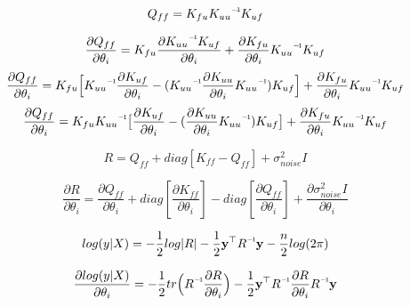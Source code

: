 \documentclass{article}
\newcommand\inv[1]{#1\raisebox{1.15ex}{$\scriptscriptstyle-\!1$}}
\begin{document}
  \begin{equation}
    Q_{ff} = K_{fu}  \inv{K_{uu}}  K_{uf}
  \end{equation}

  \begin{equation}
    \frac{\partial Q_{ff}}{\partial \theta_{i}} =
    K_{fu}  \frac{\partial {\inv{K_{uu}}  K_{uf}}}{\partial \theta_{i}} +
    {\frac{\partial K_{fu}}{\partial \theta_{i}}}  {\inv{K_{uu}}  K_{uf}}
  \end{equation}
  \begin{equation}
    \frac{\partial Q_{ff}}{\partial \theta_{i}} =
    K_{fu}  \Big[ \inv{K_{uu}}  \frac{\partial K_{uf}}{\partial \theta_{i}}  -
      (\inv{K_{uu}}  \frac{\partial K_{uu}}{\partial \theta_{i}}  \inv{K_{uu}})  K_{uf}
        \Big] +
        \frac{\partial K_{fu}}{\partial \theta_{i}}  \inv{K_{uu}}  K_{uf}
  \end{equation}
  \begin{equation}
    \frac{\partial Q_{ff}}{\partial \theta_{i}} =
    K_{fu}  \inv{K_{uu}}  \big[ \frac{\partial K_{uf}}{\partial \theta_{i}}  -
      (\frac{\partial K_{uu}}{\partial \theta_{i}}  \inv{K_{uu}})  K_{uf}
        \big] +
        \frac{\partial K_{fu}}{\partial \theta_{i}}  \inv{K_{uu}}  K_{uf}
  \end{equation}

  \begin{equation}
    R = Q_{ff} + diag[{K_{ff} - Q_{ff}}] + \sigma^{2}_{noise} I
  \end{equation}

  \begin{equation}
    \frac{\partial R}{\partial \theta_{i}} = \frac{\partial Q_{ff}}{\partial \theta_{i}}
    + diag[\frac{\partial K_{ff}}{\partial \theta_{i}}]
    - diag[\frac{\partial Q_{ff}}{\partial \theta_{i}}]
    + \frac{\partial \sigma^{2}_{noise} I }{\partial \theta_{i}}
  \end{equation}

  \begin{equation}
    log(y | X) = -\frac{1}{2}log | R | -  \frac{1}{2} \textbf{y}^\top \inv{R} \textbf{y}
    - \frac{n}{2} log(2 \pi)
  \end{equation}


  \begin{equation}
    \frac{\partial log(y | X)}{\partial \theta_{i}} =
    - \frac{1}{2} tr \Big(\inv{R} \frac{{\partial R}}{\partial \theta_{i}} \Big)
    -\frac{1}{2} \textbf{y}^{\top} \inv{R} \frac{\partial R}{\partial \theta_{i}} \inv{R} \textbf{y}
  \end{equation}
\end{document}
